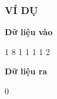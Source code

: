 \subsubsection{   VÍ DỤ  }

\textbf{    Dữ liệu vào   }

   1 8 1 1 1 1 2  

\textbf{    Dữ liệu ra   }

   0  




